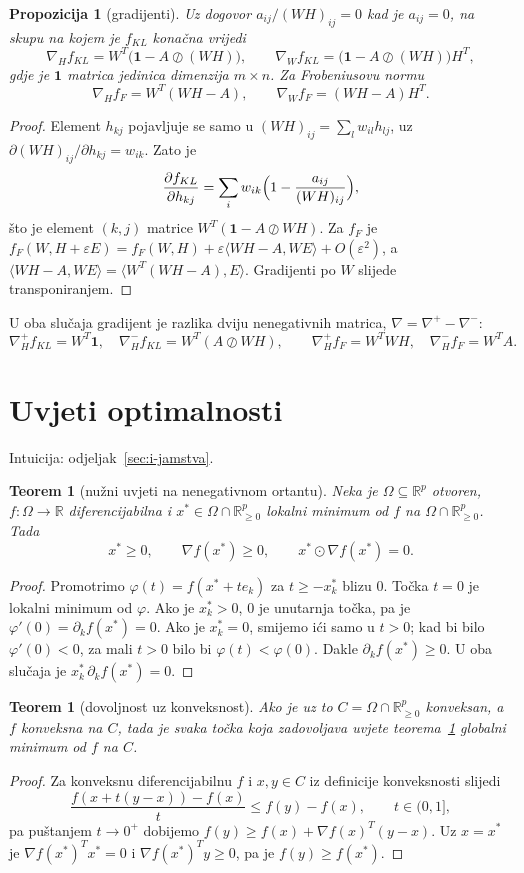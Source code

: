 \documentclass[11pt,a4paper]{article}
\theoremstyle{definition}
\theoremstyle{plain}
\newtheorem{teorem}[definicija]{Teorem}
\newtheorem{propozicija}[definicija]{Propozicija}
\theoremstyle{remark}
\newcommand{\R}{\mathbb{R}}
\newcommand{\Rp}{\mathbb{R}_{\geq 0}}
\newcommand{\one}{\mathbf{1}}
\newcommand{\intuicija}[1]{{\small\color{muted}\sffamily Intuicija: odjeljak~\ref{#1}.}\par}
\begin{document}
\begin{propozicija}[gradijenti]\label{prop:gradijenti}
Uz dogovor $a_{ij}/(WH)_{ij}=0$ kad je $a_{ij}=0$, na skupu na kojem je $f_{KL}$ konačna vrijedi
\[
  \nabla_H f_{KL}=W^T\bigl(\one-A\oslash(WH)\bigr),\qquad
  \nabla_W f_{KL}=\bigl(\one-A\oslash(WH)\bigr)H^T,
\]
gdje je $\one$ matrica jedinica dimenzija $m\times n$. Za Frobeniusovu normu
\[
  \nabla_H f_F=W^T(WH-A),\qquad \nabla_W f_F=(WH-A)H^T.
\]
\end{propozicija}
\begin{proof}
Element $h_{kj}$ pojavljuje se samo u $(WH)_{ij}=\sum_lw_{il}h_{lj}$, uz
$\partial(WH)_{ij}/\partial h_{kj}=w_{ik}$. Zato je
\[
  \frac{\partial f_{KL}}{\partial h_{kj}}=\sum_i w_{ik}\Bigl(1-\frac{a_{ij}}{(WH)_{ij}}\Bigr),
\]
što je element $(k,j)$ matrice $W^T(\one-A\oslash WH)$. Za $f_F$ je
$f_F(W,H+\varepsilon E)=f_F(W,H)+\varepsilon\langle WH-A,WE\rangle+O(\varepsilon^2)$, a
$\langle WH-A,WE\rangle=\langle W^T(WH-A),E\rangle$. Gradijenti po $W$ slijede transponiranjem.
\end{proof}

U oba slučaja gradijent je razlika dviju nenegativnih matrica, $\nabla=\nabla^+-\nabla^-$:
\[
  \nabla_H^+f_{KL}=W^T\one,\quad \nabla_H^-f_{KL}=W^T(A\oslash WH),\qquad
  \nabla_H^+f_F=W^TWH,\quad \nabla_H^-f_F=W^TA.
\]

\section{Uvjeti optimalnosti}\label{sec:f-kkt}
\intuicija{sec:i-jamstva}

\begin{teorem}[nužni uvjeti na nenegativnom ortantu]\label{tm:kkt}
Neka je $\Omega\subseteq\R^p$ otvoren, $f\colon\Omega\to\R$ diferencijabilna i $x^*\in\Omega\cap\Rp^p$
lokalni minimum od $f$ na $\Omega\cap\Rp^p$. Tada
\[
  x^*\geq0,\qquad \nabla f(x^*)\geq0,\qquad x^*\odot\nabla f(x^*)=0.
\]
\end{teorem}
\begin{proof}
Promotrimo $\varphi(t)=f(x^*+te_k)$ za $t\geq-x^*_k$ blizu $0$. Točka $t=0$ je lokalni minimum od
$\varphi$. Ako je $x_k^*>0$, $0$ je unutarnja točka, pa je $\varphi'(0)=\partial_kf(x^*)=0$. Ako je
$x_k^*=0$, smijemo ići samo u $t>0$; kad bi bilo $\varphi'(0)<0$, za mali $t>0$ bilo bi
$\varphi(t)<\varphi(0)$. Dakle $\partial_kf(x^*)\geq0$. U oba slučaja je $x^*_k\,\partial_kf(x^*)=0$.
\end{proof}

\begin{teorem}[dovoljnost uz konveksnost]\label{tm:kkt-dovoljno}
Ako je uz to $C=\Omega\cap\Rp^p$ konveksan, a $f$ konveksna na $C$, tada je svaka točka koja
zadovoljava uvjete teorema~\ref{tm:kkt} globalni minimum od $f$ na $C$.
\end{teorem}
\begin{proof}
Za konveksnu diferencijabilnu $f$ i $x,y\in C$ iz definicije konveksnosti slijedi
\[
  \frac{f(x+t(y-x))-f(x)}{t}\leq f(y)-f(x),\qquad t\in(0,1],
\]
pa puštanjem $t\to0^+$ dobijemo $f(y)\geq f(x)+\nabla f(x)^T(y-x)$. Uz $x=x^*$ je $\nabla f(x^*)^Tx^*=0$ i $\nabla f(x^*)^Ty\geq0$,
pa je $f(y)\geq f(x^*)$.
\end{proof}
\end{document}
